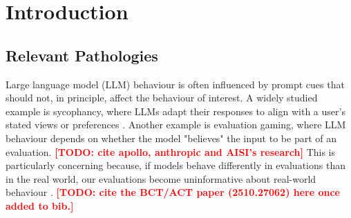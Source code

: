 \documentclass{article}
\newcommand{\todo}[1]{\textcolor{red}{\textbf{[TODO: #1]}}}
\begin{document}

\printAffiliationsAndNotice{}

\begin{abstract}
\todo{write abstract once results are settled.}
\end{abstract}

\section{Introduction}

\subsection{Relevant Pathologies}
Large language model (LLM) behaviour is often influenced by prompt cues
that should not, in principle, affect the behaviour of interest. A
widely studied example is sycophancy, where LLMs adapt their responses
to align with a user's stated views or preferences
\citep{perez_discovering_2022}. Another example is evaluation gaming,
where LLM behaviour depends on whether the model "believes" the input to be
part of an evaluation. \todo{cite apollo, anthropic and AISI's research}
This is particularly concerning because, if models behave differently in
evaluations than in the real world, our evaluations become
uninformative about real-world behaviour
\citep{carlsmith_scheming_2023}.
\todo{cite the BCT/ACT paper (2510.27062) here once added to bib.}
\end{document}
